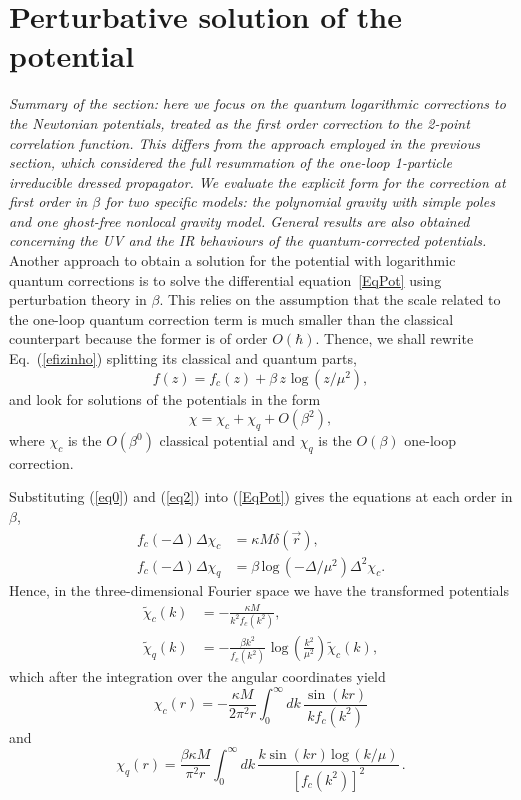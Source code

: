 \documentclass[aps,prd,a4paper,twocolumn,showpacs,showkeys,preprintnumbers,amsmath,amssymb,nofootinbib]{revtex4-2}
\renewcommand{\thesection}{\arabic{section}}
\numberwithin{equation}{section}
\let\oldsection\section%
\renewcommand{\section}{%
  \renewcommand{\theequation}{\thesection.\arabic{equation}}%
  \oldsection}%
\def\beq{\begin{equation}}
\def\eeq{\end{equation}}
\def\ln{\,\mbox{log}\,}
\newcommand{\eq}[1]{(\ref{#1})}
\newcommand{\n}[1]{\label{#1}}
\def\be{\beta}
\def\de{\delta}
\def\De{\Delta}
\def\ka{\kappa}
\begin{document}


\section{Perturbative solution of the potential}
\label{pert}
\label{Sec6}

{\it 
Summary of the section: here we focus on the quantum logarithmic corrections to the Newtonian potentials, treated as the first order correction to the 2-point correlation function. This differs from the approach employed in the previous section, which considered the full resummation of the one-loop 1-particle irreducible dressed propagator. We evaluate the explicit form for the correction at first order in $\be$ for two specific models: the polynomial gravity with simple poles and one ghost-free nonlocal gravity model. General results are also obtained concerning the UV and the IR behaviours of the quantum-corrected potentials.
}\\



Another approach to obtain a solution for the potential with logarithmic quantum corrections is to solve the differential equation~\eqref{EqPot} using perturbation theory in $\beta$. This relies on the assumption that the scale related to the one-loop quantum correction term is much smaller than the classical counterpart because the former is of order $O(\hbar)$. Thence, we shall rewrite Eq.~\eq{efizinho} splitting its classical and quantum parts,
\beq
\n{eq0}
f(z) = f_c (z) +  \be \, z \, \ln (z/ \mu^2) ,
\eeq
and look for solutions of the potentials in the form
\begin{equation} 
\n{eq2}
\chi = \chi_c + \chi_q + O(\beta^2)
,
\end{equation}
where $\chi_c$ is the $O(\be^0)$ classical potential and  $\chi_q$ is the  $O(\be)$ one-loop correction. 

Substituting \eq{eq0} and \eq{eq2} into \eq{EqPot} gives the equations at each order in $\beta$,
\begin{align}
f_c (-\De) \De \chi_c &= \ka M \de ( \vec{ r} )
,
\label{Beta0}
\\
f_c (-\De) \De \chi_q &= \be \ln (-\De/ \mu^2) \De^2 \chi_c
.
\label{Beta1}
\end{align}
Hence, in the three-dimensional Fourier space we have the transformed potentials
\begin{align}
\tilde{\chi}_c (k) &= - \frac { \ka M } { k^2 f_c (k^2) }
,
\\
\tilde{\chi}_q (k) &= - \frac{\be k^2} {f_c (k^2)} \,  \ln \left( \frac{k^2}{\mu^2} \right)  \tilde{\chi}_c (k) ,
\end{align}
which after the integration over the angular coordinates yield
\begin{equation} 
\n{class-po2}
\chi_c (r) = - \frac{\ka M}{2 \pi ^2 r} \int_0^\infty dk\, \frac{\sin (kr)}{k f_c (k^2)}
\end{equation}
and
\begin{equation} 
\n{quan-po}
\chi_q (r) =  \frac{\be \ka M}{ \pi ^2 r} \int_0^\infty dk  \,\frac{k \sin (kr)  \ln (k/\mu)}{\left[ f_c (k^2)\right]^2}\, 
.
\end{equation}
\end{document}

